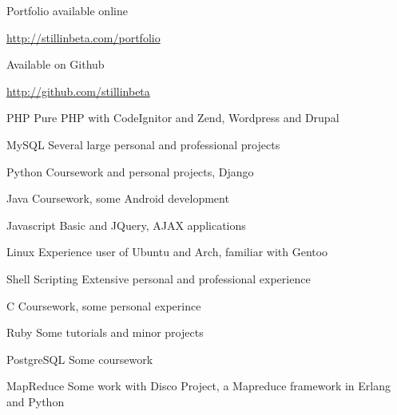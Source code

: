 \documentclass[letterpaper,11pt,notitlepage]{article}
\begin{document}
\vbar
{}
        \begin{employment}
            \item Portfolio available online
            \item \url{http://stillinbeta.com/portfolio}
        \end{employment}
        \begin{employment}
            \item Available on Github
            \item \url{http://github.com/stillinbeta}
        \end{employment}
\vbar
{}
\begin{description*}
\item[PHP] Pure PHP with CodeIgnitor and Zend, Wordpress and Drupal
\item[MySQL] Several large personal and professional projects
\item[Python] Coursework and personal projects, Django
\item[Java] Coursework, some Android development
\item[Javascript] Basic and JQuery, AJAX applications
\item[Linux] Experience user of Ubuntu and Arch, familiar with Gentoo
\item[Shell Scripting] Extensive personal and professional experience
\item 
\item[C] Coursework, some personal experince
\item[Ruby] Some tutorials and minor projects
\item[PostgreSQL] Some coursework
\item[MapReduce] Some work with Disco Project, a Mapreduce framework in Erlang and Python
\end{description*}
\end{document}
